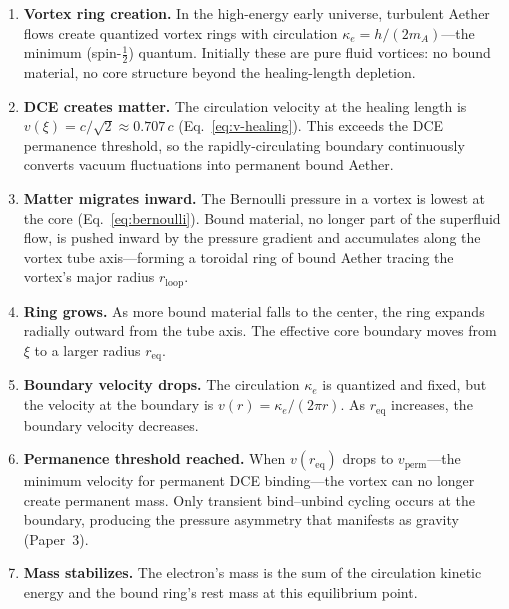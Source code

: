 \documentclass[12pt,letterpaper]{article}
\newcommand{\rloop}{r_{\mathrm{loop}}}
\begin{document}
\begin{enumerate}
  \item \textbf{Vortex ring creation.}  In the high-energy early universe,
    turbulent Aether flows create quantized vortex rings with circulation
    $\kappa_e = h/(2m_A)$---the minimum (spin-$\tfrac{1}{2}$) quantum.
    Initially these are pure fluid vortices: no bound material, no core
    structure beyond the healing-length depletion.

  \item \textbf{DCE creates matter.}  The circulation velocity at the
    healing length is $v(\xi) = c/\sqrt{2} \approx 0.707\,c$
    (Eq.~\ref{eq:v-healing}).  This exceeds the DCE permanence threshold,
    so the rapidly-circulating boundary continuously converts vacuum
    fluctuations into permanent bound Aether.

  \item \textbf{Matter migrates inward.}  The Bernoulli pressure in a vortex
    is lowest at the core (Eq.~\ref{eq:bernoulli}).  Bound material, no
    longer part of the superfluid flow, is pushed inward by the pressure
    gradient and accumulates along the vortex tube axis---forming a toroidal
    ring of bound Aether tracing the vortex's major radius $\rloop$.

  \item \textbf{Ring grows.}  As more bound material falls to the center,
    the ring expands radially outward from the tube axis.  The effective
    core boundary moves from $\xi$ to a larger radius $r_{\mathrm{eq}}$.

  \item \textbf{Boundary velocity drops.}  The circulation $\kappa_e$ is
    quantized and fixed, but the velocity at the boundary is
    $v(r) = \kappa_e/(2\pi r)$.  As $r_{\mathrm{eq}}$ increases, the
    boundary velocity decreases.

  \item \textbf{Permanence threshold reached.}  When $v(r_{\mathrm{eq}})$
    drops to $v_{\mathrm{perm}}$---the minimum velocity for permanent
    DCE binding---the vortex can no longer create permanent mass.  Only
    transient bind--unbind cycling occurs at the boundary, producing
    the pressure asymmetry that manifests as gravity (Paper~3).

  \item \textbf{Mass stabilizes.}  The electron's mass is the sum of the
    circulation kinetic energy and the bound ring's rest mass at this
    equilibrium point.
\end{enumerate}
\end{document}
